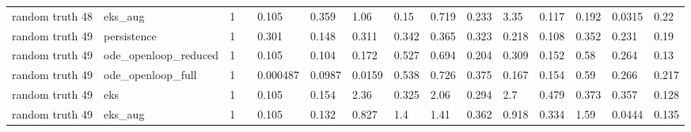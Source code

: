 \begin{table}[t]
\begin{tabular}{lllllllllllllll}
random truth 48 & eks\_aug & 1 &  & 0.105 & 0.359 & 1.06 & 0.15 & 0.719 & 0.233 & 3.35 & 0.117 & 0.192 & 0.0315 & 0.22 \\
random truth 49 & persistence & 1 &  & 0.301 & 0.148 & 0.311 & 0.342 & 0.365 & 0.323 & 0.218 & 0.108 & 0.352 & 0.231 & 0.19 \\
random truth 49 & ode\_openloop\_reduced & 1 &  & 0.105 & 0.104 & 0.172 & 0.527 & 0.694 & 0.204 & 0.309 & 0.152 & 0.58 & 0.264 & 0.13 \\
random truth 49 & ode\_openloop\_full & 1 &  & 0.000487 & 0.0987 & 0.0159 & 0.538 & 0.726 & 0.375 & 0.167 & 0.154 & 0.59 & 0.266 & 0.217 \\
random truth 49 & eks & 1 &  & 0.105 & 0.154 & 2.36 & 0.325 & 2.06 & 0.294 & 2.7 & 0.479 & 0.373 & 0.357 & 0.128 \\
random truth 49 & eks\_aug & 1 &  & 0.105 & 0.132 & 0.827 & 1.4 & 1.41 & 0.362 & 0.918 & 0.334 & 1.59 & 0.0444 & 0.135 \\
\bottomrule
\end{tabular}
\end{table}
